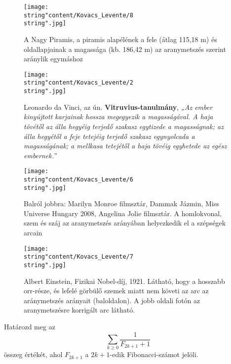 \begin{figure}[h!]
\centering \texttt{[image: \\string"content/Kovacs\_Levente/8\\string".jpg]}
\vspace{2mm}
 \caption{A Nagy Piramis, a piramis alapélének a fele (átlag 115,18 m) és oldallapjainak
a magassága (kb. 186,42 m) az aranymetszés szerint aránylik egymáshoz}
\label{6}
\end{figure}

\begin{figure}[h!]
\centering \texttt{[image: \\string"content/Kovacs\_Levente/2\\string".jpg]}
\vspace{2mm}
 \caption{Leonardo da Vinci, az ún. \textbf{Vitruvius-tanulmány}, \textit{„Az
ember kinyújtott karjainak hossza megegyezik a magasságával. A haja
tövétől az álla hegyéig terjedő szakasz egytizede a magasságnak; az
álla hegyétől a feje tetejéig terjedő szakasz egynyolcada a magasságának;
a mellkasa tetejétől a haja tövéig egyhetede az egész embernek.”}}
\label{3}
\end{figure}

\newpage{}
\begin{figure}[h!]
\centering \texttt{[image: \\string"content/Kovacs\_Levente/6\\string".jpg]}
\vspace{2mm}
 \caption{Balról jobbra: Marilyn Monroe filmsztár, Dammak Jázmin, Miss Universe
Hungary 2008, Angelina Jolie filmsztár. A homlokvonal, szem és száj
az aranymetszés arányában helyezkedik el a szépségek arcain}
\label{4}
\end{figure}

\begin{figure}[h!]
\centering \texttt{[image: \\string"content/Kovacs\_Levente/7\\string".jpg]}
\vspace{2mm}
 \caption{Albert Einstein, Fizikai Nobel-díj, 1921. Látható, hogy a hosszabb
orr-része, és lefelé görbülő szemek miatt nem követi az arc az aránymetszés
arányait (baloldalon). A jobb oldali fotón az aranymetszésre korrigált
arc látható.}
\label{5}
\end{figure}

\begin{extraproblem}
Határozd meg az 
\[
\sum_{k\geq0}\frac{1}{F_{2k+1}+1}
\]
összeg értékét, ahol $F_{2k+1}$ a $2k+1$-edik Fibonacci-számot jelöli. 
\end{extraproblem}

